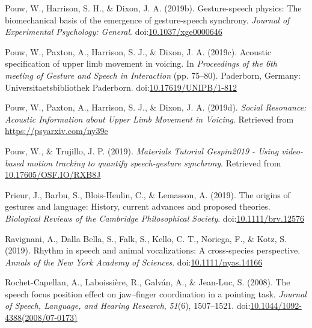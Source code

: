 \documentclass[
  man,floatsintext]{apa6}
\newlength{\cslhangindent}
\newenvironment{cslreferences}%
  {\setlength{\parindent}{0pt}%
  \everypar{\setlength{\hangindent}{\cslhangindent}}\ignorespaces}%
  {\par}
\begin{document}
\begin{cslreferences}
\leavevmode\hypertarget{ref-pouwGesturespeechPhysicsBiomechanical2019}{}%
Pouw, W., Harrison, S. H., \& Dixon, J. A. (2019b). Gesture-speech physics: The biomechanical basis of the emergence of gesture-speech synchrony. \emph{Journal of Experimental Psychology: General}. doi:\href{https://doi.org/10.1037/xge0000646}{10.1037/xge0000646}

\leavevmode\hypertarget{ref-pouwAcousticSpecificationUpper2019}{}%
Pouw, W., Paxton, A., Harrison, S. J., \& Dixon, J. A. (2019c). Acoustic specification of upper limb movement in voicing. In \emph{Proceedings of the 6th meeting of Gesture and Speech in Interaction} (pp. 75--80). Paderborn, Germany: Universitaetsbibliothek Paderborn. doi:\href{https://doi.org/10.17619/UNIPB/1-812}{10.17619/UNIPB/1-812}

\leavevmode\hypertarget{ref-pouwSocialResonanceAcoustic2019}{}%
Pouw, W., Paxton, A., Harrison, S. J., \& Dixon, J. A. (2019d). \emph{Social Resonance: Acoustic Information about Upper Limb Movement in Voicing}. Retrieved from \url{https://psyarxiv.com/ny39e}

\leavevmode\hypertarget{ref-pouwMaterialsTutorialGespin20192019}{}%
Pouw, W., \& Trujillo, J. P. (2019). \emph{Materials Tutorial Gespin2019 - Using video-based motion tracking to quantify speech-gesture synchrony}. Retrieved from \url{10.17605/OSF.IO/RXB8J}

\leavevmode\hypertarget{ref-prieurOriginsGesturesLanguage2019}{}%
Prieur, J., Barbu, S., Blois-Heulin, C., \& Lemasson, A. (2019). The origins of gestures and language: History, current advances and proposed theories. \emph{Biological Reviews of the Cambridge Philosophical Society}. doi:\href{https://doi.org/10.1111/brv.12576}{10.1111/brv.12576}

\leavevmode\hypertarget{ref-ravignaniRhythmSpeechAnimal2019}{}%
Ravignani, A., Dalla Bella, S., Falk, S., Kello, C. T., Noriega, F., \& Kotz, S. (2019). Rhythm in speech and animal vocalizations: A cross‐species perspective. \emph{Annals of the New York Academy of Sciences}. doi:\href{https://doi.org/10.1111/nyas.14166}{10.1111/nyas.14166}

\leavevmode\hypertarget{ref-rochet-capellanSpeechFocusPosition2008}{}%
Rochet-Capellan, A., Laboissière, R., Galván, A., \& Jean-Luc, S. (2008). The speech focus position effect on jaw--finger coordination in a pointing task. \emph{Journal of Speech, Language, and Hearing Research}, \emph{51}(6), 1507--1521. doi:\href{https://doi.org/10.1044/1092-4388(2008/07-0173)}{10.1044/1092-4388(2008/07-0173)}


\end{cslreferences}
\end{document}

